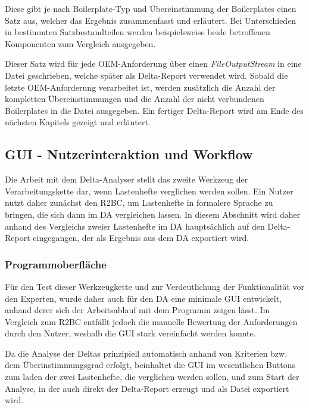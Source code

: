 \documentclass[12pt]{report}
\begin{document}
Diese gibt je nach Boilerplate-Typ und Übereinstimmung der Boilerplates einen Satz aus, welcher das Ergebnis zusammenfasst und erläutert. Bei Unterschieden in bestimmten Satzbestandteilen werden beispielsweise beide betroffenen Komponenten zum Vergleich ausgegeben. 

Dieser Satz wird für jede OEM-Anforderung über einen \textit{FileOutputStream} in eine Datei geschrieben, welche später als Delta-Report verwendet wird. Sobald die letzte OEM-Anforderung verarbeitet ist, werden zusätzlich die Anzahl der kompletten Übereinstimmungen und die Anzahl der nicht verbundenen Boilerplates in die Datei ausgegeben. Ein fertiger Delta-Report wird am Ende des nächsten Kapitels gezeigt und erläutert.

\subsection{GUI - Nutzerinteraktion und Workflow}
Die Arbeit mit dem Delta-Analyser stellt das zweite Werkzeug der Verarbeitungskette dar, wenn Lastenhefte verglichen werden sollen. Ein Nutzer nutzt daher zunächst den R2BC, um Lastenhefte in formalere Sprache zu bringen, die sich dann im DA vergleichen lassen. In diesem Abschnitt wird daher anhand des Vergleichs zweier Lastenhefte im DA hauptsächlich auf den Delta-Report eingegangen, der als Ergebnis aus dem DA exportiert wird. 

\subsubsection{Programmoberfläche}
Für den Test dieser Werkzeugkette und zur Verdeutlichung der Funktionalität vor den Experten, wurde daher auch für den DA eine minimale GUI entwickelt, anhand derer sich der Arbeitsablauf mit dem Programm zeigen lässt. Im Vergleich zum R2BC entfällt jedoch die manuelle Bewertung der Anforderungen durch den Nutzer, weshalb die GUI stark vereinfacht werden konnte.

Da die Analyse der Deltas prinzipiell automatisch anhand von Kriterien bzw. dem Überinstimmungsgrad erfolgt, beinhaltet die GUI im wesentlichen Buttons zum laden der zwei Lastenhefte, die verglichen werden sollen, und zum Start der Analyse, in der auch direkt der Delta-Report erzeugt und als Datei exportiert wird.
\end{document}
